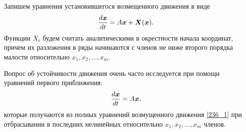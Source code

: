 Запишем уравнения установившегося возмещенного движения в виде
\begin{equation}
	\frac{d \mbox{\boldmath $x$}}{d t} = A \mbox{\boldmath $x$} + \mbox{\boldmath $X$}(\mbox{\boldmath $x$}).
	\label{236_1}
\end{equation}
Функции $X_i$ будем считать аналитическими в окрестности начала координат, причем их разложения в ряды начинаются с членов не ниже второго порядка малости относительно $x_1, x_2, \ldots, x_m$.

Вопрос об устойчивости движения очень часто исследуется при помощи уравнений первого приближения:
\begin{equation*}
	\frac{d \mbox{\boldmath $x$}}{d t} = A \mbox{\boldmath $x$},
\end{equation*}
которые получаются из полных уравнений возмущенного движения \eqref{236_1} при отбрасывании в последних нелинейных относительно $x_1, x_2, \ldots, x_m$ членов.